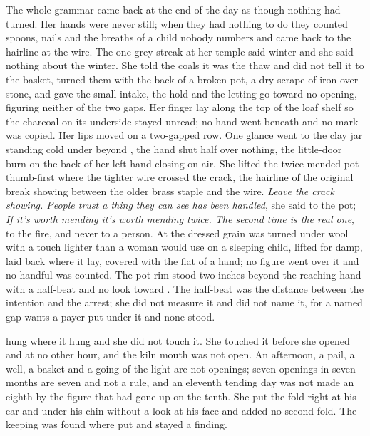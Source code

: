 The whole grammar came back at the end of the day as though nothing had turned. Her hands were never still; when they had nothing to do they counted spoons, nails and the breaths of a child nobody numbers and came back to the hairline at the wire. The one grey streak at her temple said winter and she said nothing about the winter. She told the coals it was the thaw and did not tell it to the basket, turned them with the back of a broken pot, a dry scrape of iron over stone, and gave the small intake, the hold and the letting-go toward no opening, figuring neither of the two gaps. Her finger lay along the top of the loaf shelf so the charcoal on its underside stayed unread; no hand went beneath and no mark was copied. Her lips moved on a two-gapped row. One glance went to the clay jar standing cold under  beyond , the hand shut half over nothing, the little-door burn on the back of her left hand closing on air. She lifted the twice-mended pot thumb-first where the tighter wire crossed the crack, the hairline of the original break showing between the older brass staple and the wire. \emph{Leave the crack showing. People trust a thing they can see has been handled}, she said to the pot; \emph{If it's worth mending it's worth mending twice. The second time is the real one}, to the fire, and never to a person. At  the dressed grain was turned under wool with a touch lighter than a woman would use on a sleeping child, lifted for damp, laid back where it lay, covered with the flat of a hand; no figure went over it and no handful was counted. The pot rim stood two inches beyond the reaching hand with a half-beat and no look toward . The half-beat was the distance between the intention and the arrest; she did not measure it and did not name it, for a named gap wants a payer put under it and none stood.

 hung where it hung and she did not touch it. She touched it before she opened  and at no other hour, and the kiln mouth was not open. An afternoon, a pail, a well, a basket and a going of the light are not openings; seven openings in seven months are seven and not a rule, and an eleventh tending day was not made an eighth by the figure that had gone up  on the tenth. She put the fold right at his ear and under his chin without a look at his face and added no second fold. The keeping was found where put and stayed a finding.

\scenebreak

